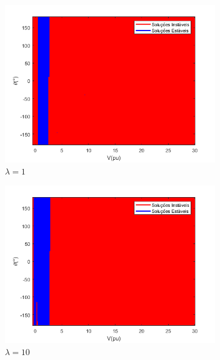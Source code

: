 \clearpage
\begin{figure}[H]
    \centering
    \caption{Mapa Fractal FPRET - IEEE 14 Barras}
    \begin{subfigure}[b]{0.45\textwidth}
        \centering
        \includegraphics[width=\textwidth]{textuais/capitulo4/figuras/FP_RET_NOM.png}
        \caption{$\lambda=1$}
    \end{subfigure}
    \vfill
    \begin{subfigure}[b]{0.45\textwidth}
        \centering
        \includegraphics[width=\textwidth]{textuais/capitulo4/figuras/FP_RET_10lambda.png}
        \caption{$\lambda=10$}
    \end{subfigure}
    \vfill
    \begin{subfigure}[b]{0.45\textwidth}

\end{subfigure}
\end{figure}
